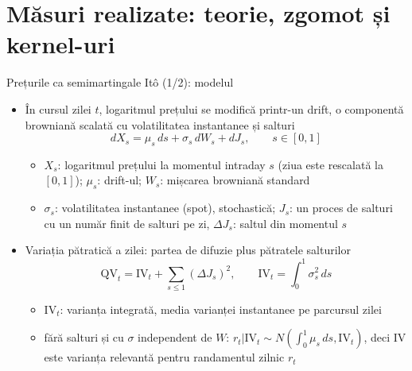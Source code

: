 \section{Măsuri realizate: teorie, zgomot și kernel-uri}

\begin{frame}{Prețurile ca semimartingale Itô (1/2): modelul}
\itemsize{\small}
\begin{itemize}
    \item În cursul zilei $t$, logaritmul prețului se modifică printr-un drift, o componentă browniană scalată cu volatilitatea instantanee și salturi
    \[ dX_s = \mu_s\,ds + \sigma_s\,dW_s + dJ_s, \qquad s \in [0, 1] \]
    \begin{itemize}
        \item $X_s$: logaritmul prețului la momentul intraday $s$ (ziua este rescalată la $[0, 1]$); $\mu_s$: drift-ul; $W_s$: mișcarea browniană standard
        \item $\sigma_s$: volatilitatea instantanee (spot), stochastică; $J_s$: un proces de salturi cu un număr finit de salturi pe zi, $\Delta J_s$: saltul din momentul $s$
    \end{itemize}
    \item Variația pătratică a zilei: partea de difuzie plus pătratele salturilor
    \[ \mathrm{QV}_t = \mathrm{IV}_t + \sum_{s \le 1}(\Delta J_s)^2, \qquad \mathrm{IV}_t = \int_0^1\sigma^2_s\,ds \]
    \begin{itemize}
        \item $\mathrm{IV}_t$: varianța integrată, media varianței instantanee pe parcursul zilei
        \item fără salturi și cu $\sigma$ independent de $W$: $r_t | \mathrm{IV}_t \sim N(\int_0^1\mu_s\,ds, \mathrm{IV}_t)$, deci IV este varianța relevantă pentru randamentul zilnic $r_t$
    \end{itemize}
\end{itemize}
\end{frame}

